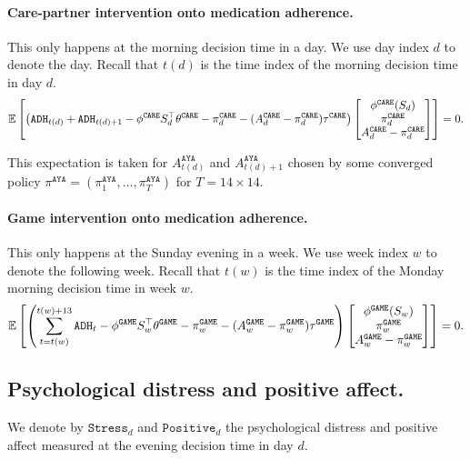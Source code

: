 \documentclass{article}
\def\AYA{{\texttt{AYA}}}
\def\EDGE{{\texttt{GAME}}}
\def\CARE{{\texttt{CARE}}}
\def\Stress{{\texttt{Stress}}}
\def\Positive{{\texttt{Positive}}}
\def\ADH{{\texttt{ADH}}}
\begin{document}
\paragraph{Care-partner intervention onto medication adherence.} This only happens at the morning decision time in a day. We use day index $d$ to denote the day. Recall that $t(d)$ is the time index of the morning decision time in day $d$.
\begin{align*}
    \E\left[\left(\ADH_{t(d)} + \ADH_{t(d)+1} - \phi^{\CARE}S_d^{\top} \theta^{\CARE} - \pi_{d}^{\CARE} - (A_d^{\CARE} - \pi_{d}^{\CARE}) \tau^{\CARE} \right) \begin{bmatrix}  \phi^{\CARE}(S_d) \\ \pi_{d}^{\CARE} \\ A_d^{\CARE}-\pi_{d}^{\CARE} \end{bmatrix} \right] = 0.
\end{align*}

This expectation is taken for $A_{t(d)}^{\AYA}$ and $A_{t(d)+1}^{\AYA}$ chosen by some converged policy $\pi^{\AYA} = (\pi_{1}^{\AYA}, \dots, \pi_{T}^{\AYA})$ for $T = 14 \times 14$.

\paragraph{Game intervention onto medication adherence.} This only happens at the Sunday evening in a week. We use week index $w$ to denote the following week. Recall that $t(w)$ is the time index of the Monday morning decision time in week $w$.
\begin{align*}
    \E\left[\left( \sum_{t = t(w)}^{t(w)+13} \ADH_t - \phi^{\EDGE}S_w^{\top} \theta^{\EDGE} - \pi_{w}^{\EDGE} - (A_w^{\EDGE} - \pi_{w}^{\EDGE}) \tau^{\EDGE} \right) \begin{bmatrix}  \phi^{\EDGE}(S_w) \\ \pi_{w}^{\EDGE} \\ A_w^{\EDGE}-\pi_{w}^{\EDGE} \end{bmatrix} \right] = 0.
\end{align*}

\subsection{Psychological distress and positive affect.}

We denote by $\Stress_d$ and $\Positive_d$ the psychological distress and positive affect measured at the evening decision time in day $d$.
\end{document}
